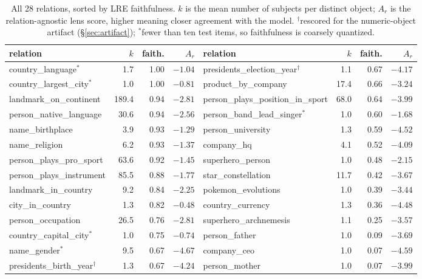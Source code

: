 \begin{table}[t]
\centering\footnotesize
\begin{tabular}{@{}lrrr@{\hspace{3em}}lrrr@{}}
\toprule
relation & $k$ & faith. & $A_r$ & relation & $k$ & faith. & $A_r$ \\
\midrule
country\_language$^{*}$ & 1.7 & 1.00 & $-1.04$ & presidents\_election\_year$^{\dagger}$ & 1.1 & 0.67 & $-4.17$ \\
country\_largest\_city$^{*}$ & 1.0 & 1.00 & $-0.81$ & product\_by\_company & 17.4 & 0.66 & $-3.24$ \\
landmark\_on\_continent & 189.4 & 0.94 & $-2.81$ & person\_plays\_position\_in\_sport & 68.0 & 0.64 & $-3.99$ \\
person\_native\_language & 30.6 & 0.94 & $-2.56$ & person\_band\_lead\_singer$^{*}$ & 1.0 & 0.60 & $-1.68$ \\
name\_birthplace & 3.9 & 0.93 & $-1.29$ & person\_university & 1.3 & 0.59 & $-4.52$ \\
name\_religion & 6.2 & 0.93 & $-1.37$ & company\_hq & 4.1 & 0.52 & $-4.09$ \\
person\_plays\_pro\_sport & 63.6 & 0.92 & $-1.45$ & superhero\_person & 1.0 & 0.48 & $-2.15$ \\
person\_plays\_instrument & 85.5 & 0.88 & $-1.77$ & star\_constellation & 11.7 & 0.42 & $-3.67$ \\
landmark\_in\_country & 9.2 & 0.84 & $-2.25$ & pokemon\_evolutions & 1.0 & 0.39 & $-3.44$ \\
city\_in\_country & 1.3 & 0.82 & $-0.48$ & country\_currency & 1.3 & 0.36 & $-4.48$ \\
person\_occupation & 26.5 & 0.76 & $-2.81$ & superhero\_archnemesis & 1.1 & 0.25 & $-3.57$ \\
country\_capital\_city$^{*}$ & 1.0 & 0.75 & $-0.74$ & person\_father & 1.0 & 0.09 & $-3.69$ \\
name\_gender$^{*}$ & 9.5 & 0.67 & $-4.67$ & company\_ceo & 1.0 & 0.07 & $-4.59$ \\
presidents\_birth\_year$^{\dagger}$ & 1.3 & 0.67 & $-4.24$ & person\_mother & 1.0 & 0.07 & $-3.99$ \\
\bottomrule
\end{tabular}
\caption{All 28 relations, sorted by LRE faithfulness. $k$ is the mean number
of subjects per distinct object; $A_r$ is the relation-agnostic lens score, higher
meaning closer agreement with the model. $^{\dagger}$rescored for the
numeric-object artifact (\S\ref{sec:artifact}); $^{*}$fewer than ten test items,
so faithfulness is coarsely quantized.}
\label{tab:relations}
\end{table}
